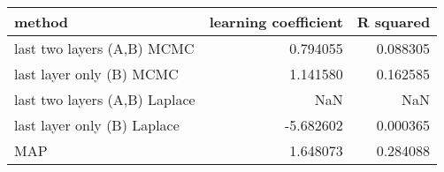 \begin{tabular}{lrr}
\toprule
                        method &  learning coefficient &  R squared \\
\midrule
    last two layers (A,B) MCMC &              0.794055 &   0.088305 \\
      last layer only (B) MCMC &              1.141580 &   0.162585 \\
 last two layers (A,B) Laplace &                   NaN &        NaN \\
   last layer only (B) Laplace &             -5.682602 &   0.000365 \\
                           MAP &              1.648073 &   0.284088 \\
\bottomrule
\end{tabular}
